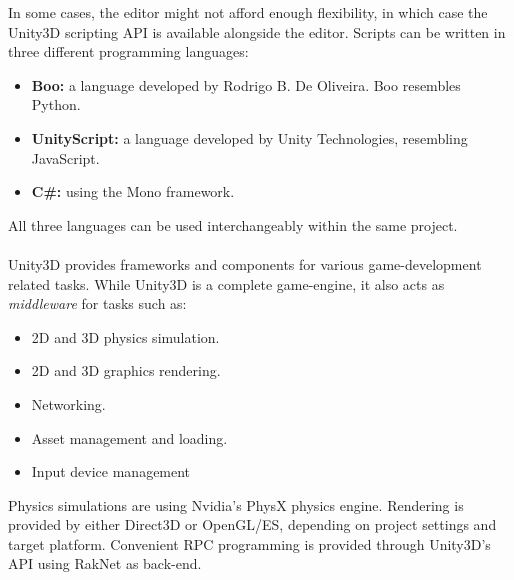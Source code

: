 In some cases, the editor might not afford enough flexibility, in which case
the Unity3D scripting API is available alongside the editor.
Scripts can be written in three different programming languages:

\begin{itemize}
    \item \textbf{Boo:} a language developed by Rodrigo B. De Oliveira. Boo resembles Python.
    \item \textbf{UnityScript:} a language developed by Unity
        Technologies, resembling JavaScript.
    \item \textbf{C\#:} using the Mono framework.
\end{itemize}

All three languages can be used interchangeably within the same project.
\\
\\
Unity3D provides frameworks and components for various game-development related
tasks. While Unity3D is a complete game-engine, it also acts as \textit{middleware} for tasks such as:
\begin{itemize}
    \item 2D and 3D physics simulation.
    \item 2D and 3D graphics rendering.
    \item Networking.
    \item Asset management and loading.
    \item Input device management
\end{itemize}

Physics simulations are using Nvidia's PhysX physics engine\cite{unityengineoverview}. Rendering is
provided by either Direct3D or OpenGL/ES, depending on project settings and target platform.
Convenient RPC programming is provided through Unity3D's API using RakNet as back-end.


